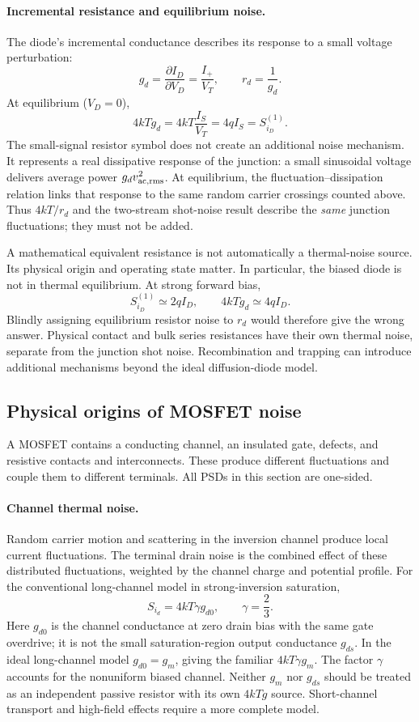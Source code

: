 \paragraph{Incremental resistance and equilibrium noise.}
The diode's incremental conductance describes its response to a small voltage perturbation:
\[
g_d=\frac{\partial I_D}{\partial V_D}
=\frac{I_+}{V_T},\qquad r_d=\frac1{g_d}.
\]
At equilibrium ($V_D=0$),
\[
4kTg_d=4kT\frac{I_S}{V_T}=4qI_S=S_{i_D}^{(1)}.
\]
The small-signal resistor symbol does not create an additional noise mechanism. It represents a real dissipative response of the junction: a small sinusoidal voltage delivers average power $g_d v_{\mathrm{ac},\mathrm{rms}}^2$. At equilibrium, the fluctuation--dissipation relation links that response to the same random carrier crossings counted above. Thus $4kT/r_d$ and the two-stream shot-noise result describe the \emph{same} junction fluctuations; they must not be added.

A mathematical equivalent resistance is not automatically a thermal-noise source. Its physical origin and operating state matter. In particular, the biased diode is not in thermal equilibrium. At strong forward bias,
\[
S_{i_D}^{(1)}\simeq2qI_D,\qquad 4kTg_d\simeq4qI_D.
\]
Blindly assigning equilibrium resistor noise to $r_d$ would therefore give the wrong answer. Physical contact and bulk series resistances have their own thermal noise, separate from the junction shot noise. Recombination and trapping can introduce additional mechanisms beyond the ideal diffusion-diode model.

\subsection{Physical origins of MOSFET noise}
\label{sec:rf-device}
A MOSFET contains a conducting channel, an insulated gate, defects, and resistive contacts and interconnects. These produce different fluctuations and couple them to different terminals. All PSDs in this section are one-sided.

\paragraph{Channel thermal noise.}
Random carrier motion and scattering in the inversion channel produce local current fluctuations. The terminal drain noise is the combined effect of these distributed fluctuations, weighted by the channel charge and potential profile. For the conventional long-channel model in strong-inversion saturation,
\begin{equation}
S_{i_d}=4kT\gamma g_{d0},\qquad \gamma=\frac23.
\end{equation}
Here $g_{d0}$ is the channel conductance at zero drain bias with the same gate overdrive; it is not the small saturation-region output conductance $g_{ds}$. In the ideal long-channel model $g_{d0}=g_m$, giving the familiar $4kT\gamma g_m$. The factor $\gamma$ accounts for the nonuniform biased channel. Neither $g_m$ nor $g_{ds}$ should be treated as an independent passive resistor with its own $4kTg$ source. Short-channel transport and high-field effects require a more complete model.

